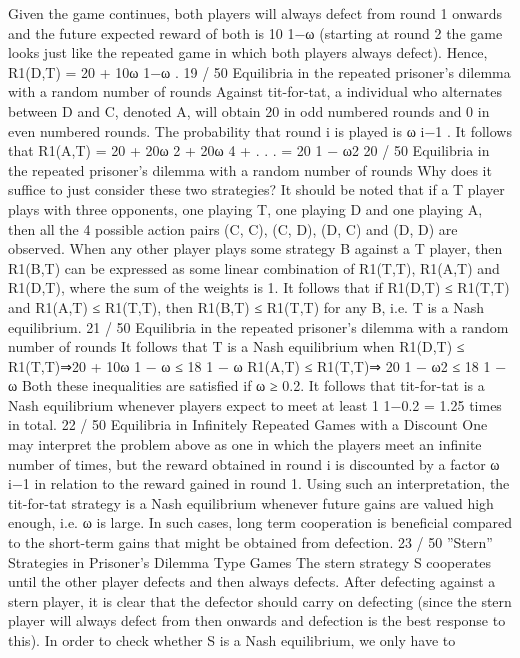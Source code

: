 Given the game continues, both players will always defect from
round 1 onwards and the future expected reward of both is 10
1−ω
(starting at round 2 the game looks just like the repeated game in
which both players always defect).
Hence, R1(D,T) = 20 + 10ω
1−ω
.
19 / 50
Equilibria in the repeated prisoner’s dilemma with a
random number of rounds
Against tit-for-tat, a individual who alternates between D and C,
denoted A, will obtain 20 in odd numbered rounds and 0 in even
numbered rounds. The probability that round i is played is ω
i−1
.
It follows that
R1(A,T) = 20 + 20ω
2 + 20ω
4 + . . . =
20
1 − ω2
20 / 50
Equilibria in the repeated prisoner’s dilemma with a
random number of rounds
Why does it suffice to just consider these two strategies?
It should be noted that if a T player plays with three opponents,
one playing T, one playing D and one playing A, then all the 4
possible action pairs (C, C), (C, D), (D, C) and (D, D) are
observed.
When any other player plays some strategy B against a T player,
then R1(B,T) can be expressed as some linear combination of
R1(T,T), R1(A,T) and R1(D,T), where the sum of the weights
is 1.
It follows that if R1(D,T) ≤ R1(T,T) and R1(A,T) ≤ R1(T,T),
then R1(B,T) ≤ R1(T,T) for any B, i.e. T is a Nash equilibrium.
21 / 50
Equilibria in the repeated prisoner’s dilemma with a
random number of rounds
It follows that T is a Nash equilibrium when
R1(D,T) ≤ R1(T,T)⇒20 + 10ω
1 − ω
≤
18
1 − ω
R1(A,T) ≤ R1(T,T)⇒
20
1 − ω2
≤
18
1 − ω
Both these inequalities are satisfied if ω ≥ 0.2. It follows that
tit-for-tat is a Nash equilibrium whenever players expect to meet at
least 1
1−0.2 = 1.25 times in total.
22 / 50
Equilibria in Infinitely Repeated Games with a Discount
One may interpret the problem above as one in which the players
meet an infinite number of times, but the reward obtained in round
i is discounted by a factor ω
i−1
in relation to the reward gained in
round 1.
Using such an interpretation, the tit-for-tat strategy is a Nash
equilibrium whenever future gains are valued high enough, i.e. ω is
large.
In such cases, long term cooperation is beneficial compared to the
short-term gains that might be obtained from defection.
23 / 50
”Stern” Strategies in Prisoner’s Dilemma Type Games
The stern strategy S cooperates until the other player defects and
then always defects.
After defecting against a stern player, it is clear that the defector
should carry on defecting (since the stern player will always defect
from then onwards and defection is the best response to this).
In order to check whether S is a Nash equilibrium, we only have to
